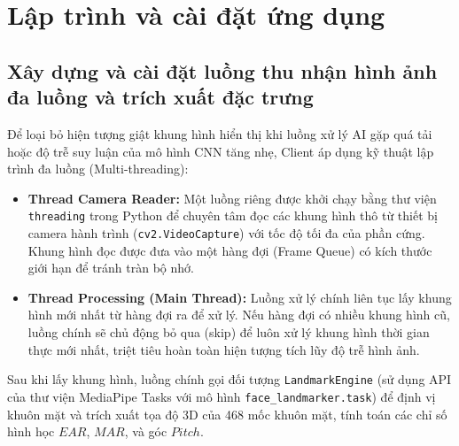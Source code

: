 \documentclass[../DoAn.tex]{subfiles}
\begin{document}
\section{Lập trình và cài đặt ứng dụng}
\label{section:5.1}

\subsection{Xây dựng và cài đặt luồng thu nhận hình ảnh đa luồng và trích xuất đặc trưng}
Để loại bỏ hiện tượng giật khung hình hiển thị khi luồng xử lý AI gặp quá tải hoặc độ trễ suy luận của mô hình CNN tăng nhẹ, Client áp dụng kỹ thuật lập trình đa luồng (Multi-threading):
\begin{itemize}
    \item \textbf{Thread Camera Reader:} Một luồng riêng được khởi chạy bằng thư viện \texttt{threading} trong Python để chuyên tâm đọc các khung hình thô từ thiết bị camera hành trình (\texttt{cv2.VideoCapture}) với tốc độ tối đa của phần cứng. Khung hình đọc được đưa vào một hàng đợi (Frame Queue) có kích thước giới hạn để tránh tràn bộ nhớ.
    \item \textbf{Thread Processing (Main Thread):} Luồng xử lý chính liên tục lấy khung hình mới nhất từ hàng đợi ra để xử lý. Nếu hàng đợi có nhiều khung hình cũ, luồng chính sẽ chủ động bỏ qua (skip) để luôn xử lý khung hình thời gian thực mới nhất, triệt tiêu hoàn toàn hiện tượng tích lũy độ trễ hình ảnh.
\end{itemize}

Sau khi lấy khung hình, luồng chính gọi đối tượng \texttt{LandmarkEngine} (sử dụng API của thư viện MediaPipe Tasks với mô hình \texttt{face\_landmarker.task}) để định vị khuôn mặt và trích xuất tọa độ 3D của 468 mốc khuôn mặt, tính toán các chỉ số hình học $EAR$, $MAR$, và góc $Pitch$.
\end{document}
